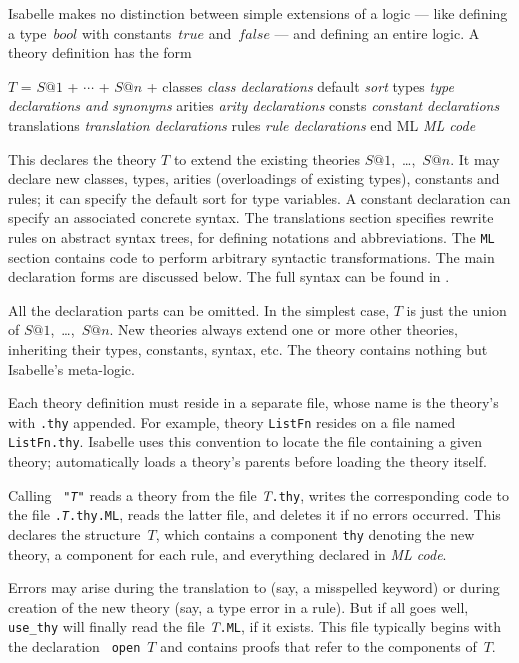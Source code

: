 Isabelle makes no distinction between simple extensions of a logic --- like
defining a type~$bool$ with constants~$true$ and~$false$ --- and defining
an entire logic.  A theory definition has the form
\begin{ttbox}
\(T\) = \(S@1\) + \(\cdots\) + \(S@n\) +
classes      {\it class declarations}
default      {\it sort}
types        {\it type declarations and synonyms}
arities      {\it arity declarations}
consts       {\it constant declarations}
translations {\it translation declarations}
rules        {\it rule declarations}
end
ML           {\it ML code}
\end{ttbox}
This declares the theory $T$ to extend the existing theories
$S@1$,~\ldots,~$S@n$.  It may declare new classes, types, arities
(overloadings of existing types), constants and rules; it can specify the
default sort for type variables.  A constant declaration can specify an
associated concrete syntax.  The translations section specifies rewrite
rules on abstract syntax trees, for defining notations and abbreviations.
The {\tt ML} section contains code to perform arbitrary syntactic
transformations.  The main declaration forms are discussed below.
The full syntax can be found in .

All the declaration parts can be omitted.  In the simplest case, $T$ is
just the union of $S@1$,~\ldots,~$S@n$.  New theories always extend one
or more other theories, inheriting their types, constants, syntax, etc.
The theory  contains nothing but Isabelle's meta-logic.

Each theory definition must reside in a separate file, whose name is the
theory's with {\tt.thy} appended.  For example, theory {\tt ListFn} resides
on a file named {\tt ListFn.thy}.  Isabelle uses this convention to locate the
file containing a given theory;  automatically loads a
theory's parents before loading the theory itself.

Calling ~{\tt"{\it T\/}"} reads a theory from the
file {\it T}{\tt.thy}, writes the corresponding {\ML} code to the file
{\tt.{\it T}.thy.ML}, reads the latter file, and deletes it if no errors
occurred.  This declares the {\ML} structure~$T$, which contains a component
{\tt thy} denoting the new theory, a component for each rule, and everything
declared in {\it ML code}.

Errors may arise during the translation to {\ML} (say, a misspelled keyword)
or during creation of the new theory (say, a type error in a rule).  But if
all goes well, {\tt use_thy} will finally read the file {\it T}{\tt.ML}, if
it exists.  This file typically begins with the {\ML} declaration {\tt
open}~$T$ and contains proofs that refer to the components of~$T$.

